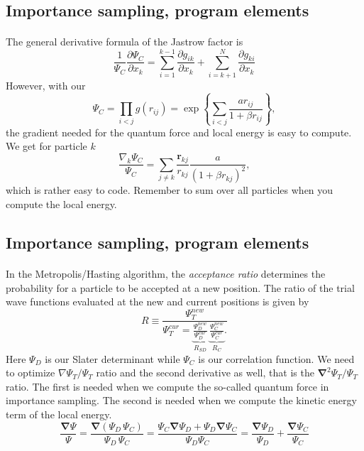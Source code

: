 \documentclass[%
twoside,                 %
final,                   %
10pt]{article}
\begin{document}
{{{{{{%
\subsection{Importance sampling, program elements}

\paragraph{}
The general derivative formula of the Jastrow factor is
\[
\frac{1}{\Psi_C}\frac{\partial \Psi_C}{\partial x_k} =
\sum_{i=1}^{k-1}\frac{\partial g_{ik}}{\partial x_k}
+
\sum_{i=k+1}^{N}\frac{\partial g_{ki}}{\partial x_k}
\]
However, 
with our
\[
\Psi_C=\prod_{i< j}g(r_{ij})= \exp{\left\{\sum_{i<j}\frac{ar_{ij}}{1+\beta r_{ij}}\right\}},
\]
the gradient needed for the quantum force and local energy is easy to compute.  
We get for particle  $k$
\[
\frac{ \nabla_k \Psi_C}{ \Psi_C }= \sum_{j\ne k}\frac{\mathbf{r}_{kj}}{r_{kj}}\frac{a}{(1+\beta r_{kj})^2},
\]
which is rather easy to code.  Remember to sum over all particles  when you compute the local energy.




\subsection{Importance sampling, program elements}

\paragraph{}
In the Metropolis/Hasting algorithm, the \emph{acceptance ratio} determines the probability for a particle  to be accepted at a new position. The ratio of the trial wave functions evaluated at the new and current positions is given by
\[
R \equiv \frac{\Psi_{T}^{new}}{\Psi_{T}^{cur} = \underbrace{\frac{\Psi_{D}^{new}}{\Psi_{D}^{cur}}}_{R_{SD}}\, \underbrace{\frac{\Psi_{C}^{new}}{\Psi_{C}^{cur}}}_{R_{C}}.}
\]
Here $\Psi_{D}$ is our Slater determinant while $\Psi_{C}$ is our correlation function. 
We need to optimize $\nabla \Psi_T / \Psi_T$ ratio and the second derivative as well, that is
the $\mathbf{\nabla}^2 \Psi_T/\Psi_T$ ratio. The first is needed when we compute the so-called quantum force in importance sampling.
The second is needed when we compute the kinetic energy term of the local energy.
\[
\frac{\mathbf{\mathbf{\nabla}}  \Psi}{\Psi}  = \frac{\mathbf{\nabla}  (\Psi_{D} \, \Psi_{C})}{\Psi_{D} \, \Psi_{C}}  =  \frac{ \Psi_C \mathbf{\nabla}  \Psi_{D} + \Psi_{D} \mathbf{\nabla}  \Psi_{C}}{\Psi_{D} \Psi_{C}} = \frac{\mathbf{\nabla}  \Psi_{D}}{\Psi_{D}} + \frac{\mathbf{\nabla}   \Psi_C}{ \Psi_C}
\]



}}}}}}
\end{document}
